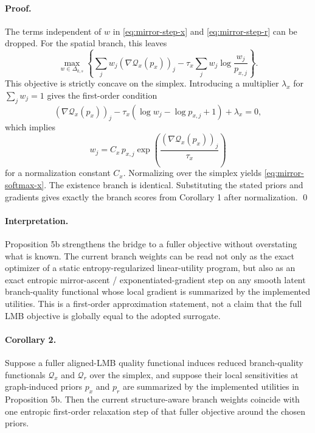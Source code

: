 \paragraph{Proof.}
The terms independent of $w$ in \eqref{eq:mirror-step-x} and \eqref{eq:mirror-step-r} can be dropped. For the spatial branch, this leaves
\begin{equation}
\max_{w \in \Delta_{k,s}}
\left\{
\sum_j w_j (\nabla \mathcal{Q}_x(p_x))_j
- \tau_x \sum_j w_j \log \frac{w_j}{p_{x,j}}
\right\}.
\end{equation}
This objective is strictly concave on the simplex. Introducing a multiplier $\lambda_x$ for $\sum_j w_j=1$ gives the first-order condition
\begin{equation}
(\nabla \mathcal{Q}_x(p_x))_j
- \tau_x\left(\log w_j - \log p_{x,j} + 1\right)
+ \lambda_x = 0,
\end{equation}
which implies
\begin{equation}
w_j = C_x\, p_{x,j}\exp\!\left(\frac{(\nabla \mathcal{Q}_x(p_x))_j}{\tau_x}\right)
\end{equation}
for a normalization constant $C_x$. Normalizing over the simplex yields \eqref{eq:mirror-softmax-x}. The existence branch is identical. Substituting the stated priors and gradients gives exactly the branch scores from Corollary 1 after normalization. \qed

\paragraph{Interpretation.}
Proposition 5b strengthens the bridge to a fuller objective without overstating what is known. The current branch weights can be read not only as the exact optimizer of a static entropy-regularized linear-utility program, but also as an exact entropic mirror-ascent / exponentiated-gradient step \citep{KivinenWarmuth1997,BeckTeboulle2003} on any smooth latent branch-quality functional whose local gradient is summarized by the implemented utilities. This is a first-order approximation statement, not a claim that the full LMB objective is globally equal to the adopted surrogate.

\paragraph{Corollary 2.}
Suppose a fuller aligned-LMB quality functional induces reduced branch-quality functionals $\mathcal{Q}_x$ and $\mathcal{Q}_r$ over the simplex, and suppose their local sensitivities at graph-induced priors $p_x$ and $p_r$ are summarized by the implemented utilities in Proposition 5b. Then the current structure-aware branch weights coincide with one entropic first-order relaxation step of that fuller objective around the chosen priors.

